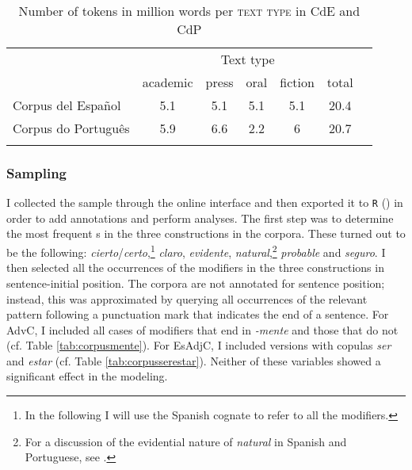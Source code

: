 \begin{table}
\begin{tabular}{lcccccc}
\lsptoprule
& \multicolumn{5}{c}{Text type}\\\cmidrule(lr){2-6}
& academic & press & oral & fiction & total\\ 
\midrule 
		Corpus del Espa\~{n}ol & 5.1 & 5.1  & 5.1 & 5.1  &20.4\\ 
		Corpus do Português    & 5.9 & 6.6  & 2.2 &   6\phantom{.1}  &20.7\\ 
\lspbottomrule
\end{tabular}
\caption{Number of tokens in million words per \textsc{text type} in CdE and CdP \label{tab:corpuscomparison}}
\end{table}

\subsubsection{Sampling}
I collected the sample through the online interface and then exported it to \verb|R| (\citealt{RCT2013}) in order to add annotations and perform analyses. 
The first step was to determine the most frequent s in the three constructions in the corpora. These turned out to be the following: \textit{cierto}/\textit{certo},\footnote{In the following I will use the Spanish cognate to refer to all  the modifiers.} \textit{claro}, \textit{evidente}, \textit{natural},\footnote{For a discussion of the evidential nature of \textit{natural} in Spanish and Portuguese, see \citet{Kocher2014}.} \textit{probable} and \textit{seguro}. I then selected all the occurrences of the modifiers in the three constructions in sentence-initial position. The corpora are not annotated for sentence position; instead, this  was approximated by querying all occurrences of the relevant pattern following a punctuation mark that indicates the end of a sentence.  For AdvC, I included all cases of modifiers that end in \textit{-mente} and those that do not (cf. Table \ref{tab:corpusmente}). For EsAdjC, I included  versions with  copulas \textit{ser} and \textit{estar} (cf. Table \ref{tab:corpusserestar}).  Neither of these variables showed a significant effect in the modeling. 

